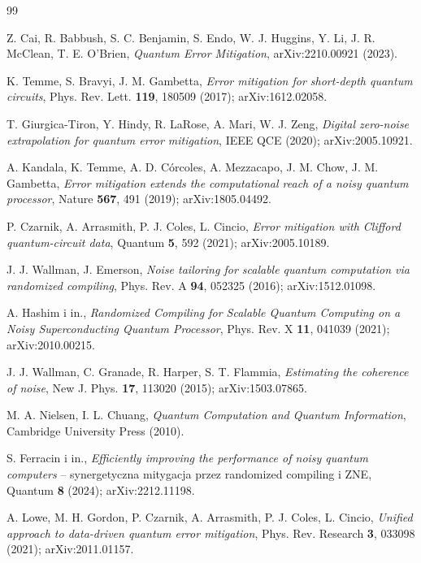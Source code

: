 \documentclass[11pt]{article}
\begin{document}
\begin{thebibliography}{99}

Z. Cai, R. Babbush, S. C. Benjamin, S. Endo, W. J. Huggins, Y. Li, J. R. McClean,
T. E. O'Brien, \emph{Quantum Error Mitigation}, arXiv:2210.00921 (2023).

K. Temme, S. Bravyi, J. M. Gambetta, \emph{Error mitigation for short-depth quantum
circuits}, Phys. Rev. Lett. \textbf{119}, 180509 (2017); arXiv:1612.02058.

T. Giurgica-Tiron, Y. Hindy, R. LaRose, A. Mari, W. J. Zeng, \emph{Digital zero-noise
extrapolation for quantum error mitigation}, IEEE QCE (2020); arXiv:2005.10921.

A. Kandala, K. Temme, A. D. Córcoles, A. Mezzacapo, J. M. Chow, J. M. Gambetta,
\emph{Error mitigation extends the computational reach of a noisy quantum processor},
Nature \textbf{567}, 491 (2019); arXiv:1805.04492.

P. Czarnik, A. Arrasmith, P. J. Coles, L. Cincio, \emph{Error mitigation with Clifford
quantum-circuit data}, Quantum \textbf{5}, 592 (2021); arXiv:2005.10189.

J. J. Wallman, J. Emerson, \emph{Noise tailoring for scalable quantum computation
via randomized compiling}, Phys. Rev. A \textbf{94}, 052325 (2016); arXiv:1512.01098.

A. Hashim i in., \emph{Randomized Compiling for Scalable Quantum Computing on a Noisy
Superconducting Quantum Processor}, Phys. Rev. X \textbf{11}, 041039 (2021); arXiv:2010.00215.

J. J. Wallman, C. Granade, R. Harper, S. T. Flammia, \emph{Estimating the coherence of
noise}, New J. Phys. \textbf{17}, 113020 (2015); arXiv:1503.07865.

M. A. Nielsen, I. L. Chuang, \emph{Quantum Computation and Quantum Information},
Cambridge University Press (2010).

S. Ferracin i in., \emph{Efficiently improving the performance of noisy quantum computers}
-- synergetyczna mitygacja przez randomized compiling i ZNE, Quantum \textbf{8} (2024);
arXiv:2212.11198.

A. Lowe, M. H. Gordon, P. Czarnik, A. Arrasmith, P. J. Coles, L. Cincio,
\emph{Unified approach to data-driven quantum error mitigation}, Phys. Rev. Research
\textbf{3}, 033098 (2021); arXiv:2011.01157.


\end{thebibliography}
\end{document}
